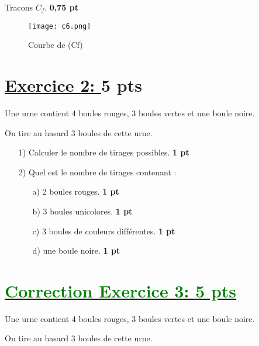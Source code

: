 \documentclass[12pt]{article}
\begin{document}
Tracons $C_f$. \textbf{0,75 pt}

\begin{center}
\begin{figure}[h]
\centering
\texttt{[image: c6.png]}
\caption{Courbe de (Cf)}
\label{fig:monimage}
\end{figure}
\end{center}

\section*{\underline{Exercice 2: }\textbf{5 pts}}
Une urne contient 4 boules rouges, 3 boules vertes et une boule noire.

On tire au hasard 3 boules de cette urne.

\begin{itemize}
\item[1)] Calculer le nombre de tirages possibles. \textbf{1 pt}
\item[2)] Quel est le nombre de tirages contenant :
\begin{itemize}
\item[a)] 2 boules rouges. \textbf{1 pt}
\item[b)] 3 boules unicolores. \textbf{1 pt}
\item[c)] 3 boules de couleurs différentes. \textbf{1 pt}
\item[d)] une boule noire. \textbf{1 pt}
\end{itemize}
\end{itemize}
\section*{\underline{\textcolor{green}{Correction Exercice 3: \textbf{5 pts}}}}
Une urne contient 4 boules rouges, 3 boules vertes et une boule noire.

On tire au hasard 3 boules de cette urne.
\end{document}
